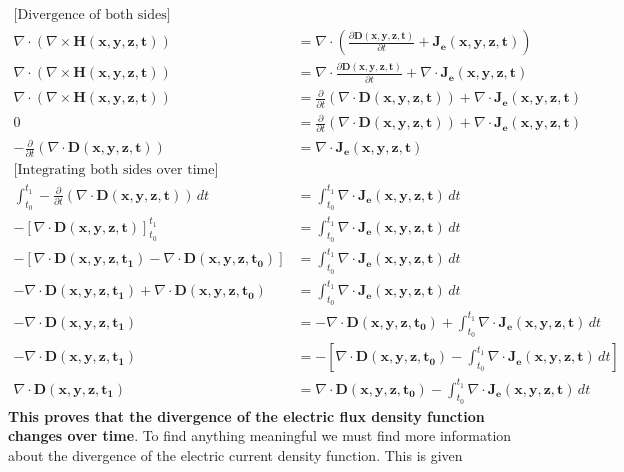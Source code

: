 \begin{align*}
  \text{[Divergence of both sides]} \\
  \nabla \cdot (\nabla \times \mathbf{H(x,y,z,t)}) &= \nabla \cdot \left(\frac{\partial \mathbf{D(x,y,z,t)}}{\partial t} + \mathbf{J_e(x,y,z,t)}\right) \\
  \nabla \cdot (\nabla \times \mathbf{H(x,y,z,t)}) &= \nabla \cdot \frac{\partial \mathbf{D(x,y,z,t)}}{\partial t} + \nabla \cdot \mathbf{J_e(x,y,z,t)} \\
  \nabla \cdot (\nabla \times \mathbf{H(x,y,z,t)}) &= \frac{\partial}{\partial t} (\nabla \cdot \mathbf{D(x,y,z,t)}) + \nabla \cdot \mathbf{J_e(x,y,z,t)} \\
  0 &= \frac{\partial}{\partial t} (\nabla \cdot \mathbf{D(x,y,z,t)}) + \nabla \cdot \mathbf{J_e(x,y,z,t)} \\
  - \frac{\partial}{\partial t} (\nabla \cdot \mathbf{D(x,y,z,t)}) &= \nabla \cdot \mathbf{J_e(x,y,z,t)} \\
  \text{[Integrating both sides over time]} \\
  \int_{t_0}^{t_1} - \frac{\partial}{\partial t} (\nabla \cdot \mathbf{D(x,y,z,t)}) \, dt &= \int_{t_0}^{t_1} \nabla \cdot \mathbf{J_e(x,y,z,t)} \, dt \\
  - \left[\nabla \cdot \mathbf{D(x,y,z,t)}\right]_{t_0}^{t_1} &= \int_{t_0}^{t_1} \nabla \cdot \mathbf{J_e(x,y,z,t)} \, dt \\
  - \left[\nabla \cdot \mathbf{D(x,y,z,t_1)} - \nabla \cdot \mathbf{D(x,y,z,t_0)}\right] &= \int_{t_0}^{t_1} \nabla \cdot \mathbf{J_e(x,y,z,t)} \, dt \\
  - \nabla \cdot \mathbf{D(x,y,z,t_1)} + \nabla \cdot \mathbf{D(x,y,z,t_0)} &=  \int_{t_0}^{t_1} \nabla \cdot \mathbf{J_e(x,y,z,t)} \, dt \\
  - \nabla \cdot \mathbf{D(x,y,z,t_1)} &= - \nabla \cdot \mathbf{D(x,y,z,t_0)} + \int_{t_0}^{t_1} \nabla \cdot \mathbf{J_e(x,y,z,t)} \, dt \\
  - \nabla \cdot \mathbf{D(x,y,z,t_1)} &= - \left[\nabla \cdot \mathbf{D(x,y,z,t_0)} - \int_{t_0}^{t_1} \nabla \cdot \mathbf{J_e(x,y,z,t)} \, dt \right] \\
  \nabla \cdot \mathbf{D(x,y,z,t_1)} &= \nabla \cdot \mathbf{D(x,y,z,t_0)} - \int_{t_0}^{t_1} \nabla \cdot \mathbf{J_e(x,y,z,t)} \, dt
\end{align*}
\textbf{This proves that the divergence of the electric flux density function
changes over time}. To find anything meaningful we must find more information
about the divergence of the electric current density function. This is given
